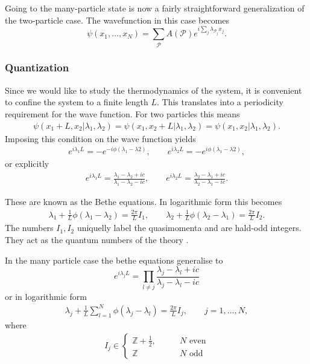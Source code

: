 \documentclass[11pt, a4paper]{report} %
\begin{document}
Going to the many-particle state is now a fairly straightforward generalization of the two-particle case.
The wavefunction in this case becomes \cite{Franchini2017}
\begin{equation}
	\psi(x_1,\ldots,x_N) = \sum_{\mathcal{P}} A(\mathcal{P}) e^{i\sum_j \lambda_{\mathcal{P}_j} x_j}.
\end{equation}


\subsubsection{Quantization}

Since we would like to study the thermodynamics of the system, it is convenient to confine the system to a finite length \(L\).
This translates into a periodicity requirement for the wave function.
For two particles this means
\begin{align}
	\psi(x_1+L,x_2|\lambda_1,\lambda_2) = \psi(x_1,x_2+L|\lambda_1,\lambda_2) = \psi(x_1,x_2|\lambda_1,\lambda_2).
\end{align}
Imposing this condition on the wave function yields
\begin{align}
  e^{i\lambda_1L} = - e^{-i\phi(\lambda_1 - \lambda2)}, \qquad e^{i\lambda_2L} = - e^{i\phi(\lambda_1 - \lambda2)},
\end{align}
or explicitly \cite{tofind}
\begin{align}
  e^{i\lambda_1L} = \frac{\lambda_1-\lambda_2 + ic}{\lambda_1-\lambda_2-ic}, \qquad e^{i\lambda_2L} = \frac{\lambda_2-\lambda_1 + ic}{\lambda_2-\lambda_1-ic}.
\end{align}

These are known as the Bethe equations.
In logarithmic form this becomes 
\begin{align}\label{eq:bethe_equations}
  \lambda_1 + \frac{1}{L} \phi(\lambda_1-\lambda_2) = \frac{2\pi}{L} I_1, \qquad \lambda_2 + \frac{1}{L} \phi(\lambda_2-\lambda_1) = \frac{2\pi}{L} I_2.
\end{align}
The numbers \(I_1, I_2\) uniquelly label the quasimomenta and are hald-odd integers. 
They act as the quantum numbers of the theory \cite{tofind}.

In the many particle case the bethe equations generalise to
\begin{equation}
  e^{i\lambda_jL} = \prod_{l\neq j} \frac{\lambda_j-\lambda_l + ic}{\lambda_j - \lambda_l - ic}
\end{equation}
or in logarithmic form
\begin{align}
  \lambda_j + \frac{1}{L} \sum_{l=1}^N \phi(\lambda_j - \lambda_l) = \frac{2\pi}{L}I_j, \qquad j = 1,\ldots,N,
\end{align}
where \cite{tofind}
\begin{align}
I_j \in 
\begin{cases}
  \mathbb{Z} + \frac{1}{2}, \qquad &N \textrm{ even}\\
  \mathbb{Z}  &N \textrm{ odd}
\end{cases}
\end{align}
\end{document}
